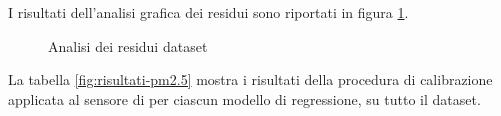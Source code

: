I risultati dell'analisi grafica dei residui sono riportati in figura \ref{fig:residui_pm2.5}.

\begin{figure}[H]
\centering
{}\hfil
{}

\hfil
{}
\caption{Analisi dei residui dataset }
\label{fig:residui_pm2.5}
\end{figure}

La tabella \ref{fig:risultati-pm2.5} mostra i risultati della procedura di calibrazione applicata al sensore di  per ciascun modello di regressione, su tutto il dataset.

